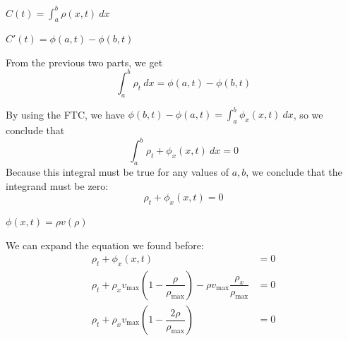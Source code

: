 \begin{solution}
\begin{slide}

\begin{parts}
	
	\item $\displaystyle C(t) = \int_a^b \rho(x,t) ~dx$
	\item $\displaystyle C'(t) = \phi(a,t) - \phi(b,t)$
	\item From the previous two parts, we get
	\[ 
		\int_a^b \rho_t ~dx = \phi(a,t) - \phi(b,t)
	\]

	By using the FTC, we have $\displaystyle \phi(b,t) - \phi(a,t) = \int_a^b \phi_x(x,t) ~dx$, so we conclude that
	\[ 
		\int_a^b \rho_t + \phi_x(x,t) ~dx = 0
	\]
	Because this integral must be true for any values of $a,b$, we conclude that the integrand must be zero:
	\[ 
		\rho_t + \phi_x(x,t) = 0
	\]	
	
	
	\item $\phi(x,t) = \rho v(\rho)$
	\item We can expand the equation we found before:
	\begin{align*}
		\rho_t + \phi_x(x,t) & = 0 \\
		\rho_t + \rho_x v_{\max} \left(1 - \dfrac{\rho}{\rho_{\max}}\right) - \rho v_{\max} \dfrac{\rho_x}{\rho_{\max}} & = 0 \\
		\rho_t + \rho_x v_{\max} \left(1 - \dfrac{2 \rho}{\rho_{\max}}\right) & = 0
	\end{align*}

\end{parts}
	
\end{slide}
	
\end{solution}





